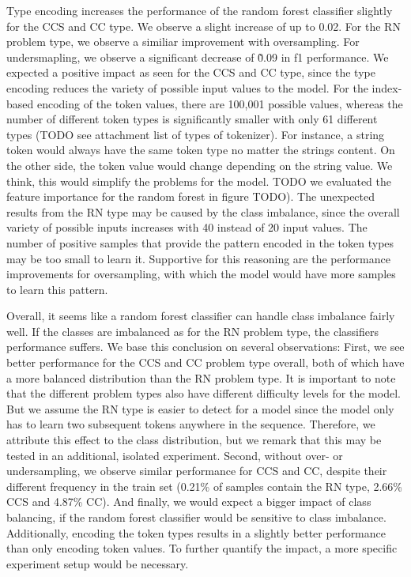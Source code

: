 Type encoding increases the performance of the random forest classifier slightly for the CCS and CC type. We observe a slight increase of up to 0.02. For the RN problem type, we observe a similiar improvement with oversampling. For undersmapling, we observe a significant decrease of \~0.09 in f1 performance. 
We expected a positive impact as seen for the CCS and CC type, since the type encoding reduces the variety of possible input values to the model. For the index-based encoding of the token values, there are 100,001 possible values, whereas the number of different token types is significantly smaller with only 61 different types (TODO see attachment list of types of tokenizer). For instance, a string token would always have the same token type no matter the strings content. On the other side, the token value would change depending on the string value. We think, this would simplify the problems for the model. TODO we evaluated the feature importance for the random forest in figure TODO).
The unexpected results from the RN type may be caused by the class imbalance, since the overall variety of possible inputs increases with 40 instead of 20 input values. The number of positive samples that provide the pattern encoded in the token types may be too small to learn it. Supportive for this reasoning are the performance improvements for oversampling, with which the model would have more samples to learn this pattern.


Overall, it seems like a random forest classifier can handle class imbalance fairly well. If the classes are imbalanced as for the RN problem type, the classifiers performance suffers.
We base this conclusion on several observations: First, we see better performance for the CCS and CC problem type overall, both of which have a more balanced distribution than the RN problem type. It is important to note that the different problem types also have different difficulty levels for the model. But we assume the RN type is easier to detect for a model since the model only has to learn two subsequent tokens anywhere in the sequence. Therefore, we attribute this effect to the class distribution, but we remark that this may be tested in an additional, isolated experiment. 
Second, without over- or undersampling, we observe similar performance for CCS and CC, despite their different frequency in the train set (0.21\% of samples contain the RN type, 2.66\% CCS and 4.87\% CC). 
And finally, we would expect a bigger impact of class balancing, if the random forest classifier would be sensitive to class imbalance.
Additionally, encoding the token types results in a slightly better performance than only encoding token values. To further quantify the impact, a more specific experiment setup would be necessary.

